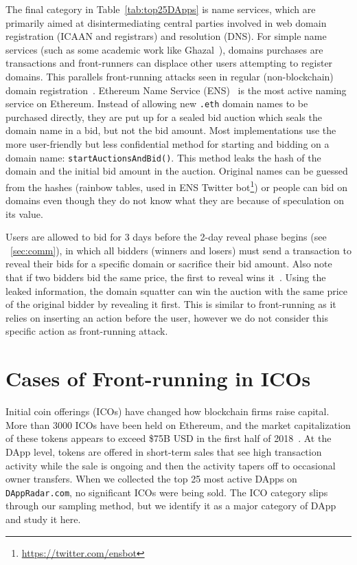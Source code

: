 The final category in Table~\ref{tab:top25DApps} is name services, which are primarily aimed at disintermediating central parties involved in web domain registration (\eg ICAAN and registrars) and resolution (\eg DNS). For simple name services (such as some academic work like Ghazal~\cite{moosavi2019ghazal}), domains purchases are transactions and front-runners can displace other users attempting to register domains. This parallels front-running attacks seen in regular (non-blockchain) domain registration~\cite{sac022en33:online}. \textsf{Ethereum Name Service (ENS)}~\cite{ensEIP} is the most active naming service on Ethereum. Instead of allowing new \texttt{.eth} domain names to be purchased directly, they are put up for a sealed bid auction which seals the domain name in a bid, but not the bid amount. Most implementations use the more user-friendly but less confidential method for starting and bidding on a domain name: \texttt{startAuctionsAndBid()}. This method leaks the hash of the domain and the initial bid amount in the auction. Original names can be guessed from the hashes (\eg rainbow tables, used in ENS Twitter bot\footnote{\url{https://twitter.com/ensbot}}) or people can bid on domains even though they do not know what they are because of speculation on its value. 

Users are allowed to bid for 3 days before the 2-day reveal phase begins (see ~\ref{sec:comm}), in which all bidders (winners and losers) must send a transaction to reveal their bids for a specific domain or sacrifice their bid amount. Also note that if two bidders bid the same price, the first to reveal wins it~\cite{ENSHandlingFrontRunningDiscussion}. Using the leaked information, the domain squatter can win the auction with the same price of the original bidder by revealing it first. This is similar to front-running as it relies on inserting an action before the user, however we do not consider this specific action as front-running attack. 



\section{Cases of Front-running in ICOs}  \label{sec:ICOsfrontrunning}

Initial coin offerings (ICOs) have changed how blockchain firms raise capital. More than 3000 ICOs have been held on Ethereum, and the market capitalization of these tokens appears to exceed \$75B USD in the first half of 2018~\cite{zetzsche2018ico}. At the DApp level, tokens are offered in short-term sales that see high transaction activity while the sale is ongoing and then the activity tapers off to occasional owner transfers. When we collected the top 25 most active DApps on \texttt{DAppRadar.com}, no significant ICOs were being sold. The ICO category slips through our sampling method, but we identify it as a major category of DApp and study it here.

